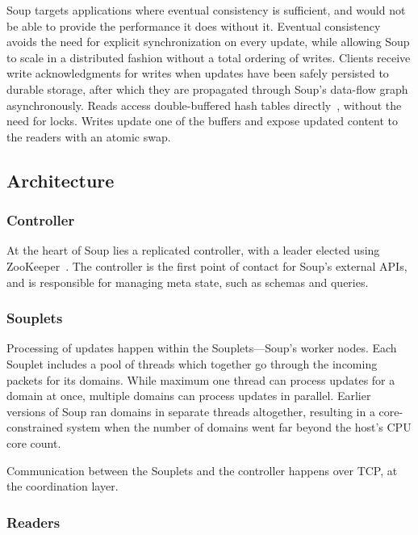 Soup targets applications where eventual consistency is sufficient, and would
not be able to provide the performance it does without it. Eventual consistency
avoids the need for explicit synchronization on every update, while allowing
Soup to scale in a distributed fashion without a total ordering of writes.
Clients receive write acknowledgments for writes when updates have been safely
persisted to durable storage, after which they are propagated through Soup's
data-flow graph asynchronously. Reads access double-buffered hash tables
directly~\cite{evmap}, without the need for locks. Writes update one of the
buffers and expose updated content to the readers with an atomic swap.

\subsection{Architecture}\label{sec:soup-architecture}


\subsubsection{Controller}

At the heart of Soup lies a replicated controller, with a leader elected
using ZooKeeper~\cite{zookeeper}. The controller is the first point of contact
for Soup's external APIs, and is responsible for managing meta state, such as
schemas and queries.

\subsubsection{Souplets}

Processing of updates happen within the Souplets---Soup's worker nodes. Each
Souplet includes a pool of threads which together go through the incoming
packets for its domains. While maximum one thread can process updates for a
domain at once, multiple domains can process updates in parallel. Earlier
versions of Soup ran domains in separate threads altogether, resulting in a
core-constrained system when the number of domains went far beyond the host's
CPU core count.

Communication between the Souplets and the controller happens over TCP, at the
coordination layer.

\subsubsection{Readers}

